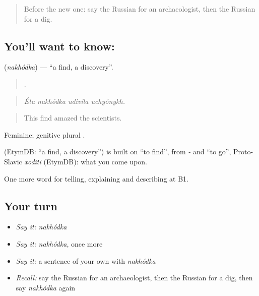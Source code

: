 \label{lesson:RU-C327-nakhodka}



\begin{quote}
Before the new one: say the Russian for an archaeologist, then the Russian for a dig.
\end{quote}

\subsection*{You'll want to know: }
\textbf{} (\emph{nakhódka}) — \textquotedblleft{}a find, a discovery\textquotedblright{}.

\begin{quote}
   .
\end{quote}

\begin{quote}
\emph{Éta nakhódka udivíla uchyónykh.}
\end{quote}

\begin{quote}
This find amazed the scientists.
\end{quote}

Feminine; genitive plural \emph{}.

\begin{cousinweb}
\emph{} (EtymDB: \textquotedblleft{}a find, a discovery\textquotedblright{}) is built on \emph{} \textquotedblleft{}to find\textquotedblright{}, from \emph{-} and \emph{} \textquotedblleft{}to go\textquotedblright{}, Proto-Slavic \emph{xoditi} (EtymDB): what you come upon.
\end{cousinweb}

\begin{grammarlens}[title={What you've built}]
One more word for telling, explaining and describing at B1.
\end{grammarlens}

\subsection*{Your turn}
\begin{itemize}
\raggedright
  \item \emph{Say it:} \emph{nakhódka}
  \item \emph{Say it:} \emph{nakhódka}, once more
  \item \emph{Say it:} a sentence of your own with \emph{nakhódka}
  \item \emph{Recall:} say the Russian for an archaeologist, then the Russian for a dig, then say \emph{nakhódka} again
\end{itemize}

